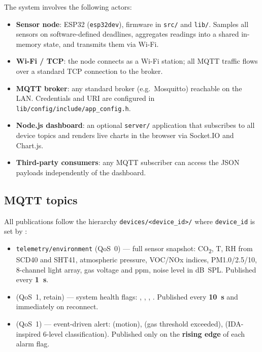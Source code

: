 \documentclass[11pt,a4paper]{article}
\begin{document}
The system involves the following actors:
\begin{itemize}[leftmargin=*]
    \item \textbf{Sensor node}: ESP32 (\texttt{esp32dev}), firmware in \texttt{src/} and \texttt{lib/}.
          Samples all sensors on software-defined deadlines, aggregates readings into a shared
          in-memory state, and transmits them via Wi-Fi.
    \item \textbf{Wi-Fi / TCP}: the node connects as a Wi-Fi station; all MQTT traffic flows over
          a standard TCP connection to the broker.
    \item \textbf{MQTT broker}: any standard broker (e.g.\ Mosquitto) reachable on the LAN.
          Credentials and URI are configured in \texttt{lib/config/include/app\_config.h}.
    \item \textbf{Node.js dashboard}: an optional \texttt{server/} application that subscribes to
          all device topics and renders live charts in the browser via Socket.IO and Chart.js.
    \item \textbf{Third-party consumers}: any MQTT subscriber can access the JSON payloads
          independently of the dashboard.
\end{itemize}

\vspace{5pt}
\subsection{MQTT topics}
\vspace{5pt}

All publications follow the hierarchy \texttt{devices/\textless device\_id\textgreater /}
where \texttt{device\_id} is set by \texttt{}:

\begin{itemize}[leftmargin=*]
    \item \texttt{telemetry/environment} (QoS~0) --- full sensor snapshot:
          CO\textsubscript{2}, T, RH from SCD40 and SHT41, atmospheric pressure, VOC/NOx indices,
          PM1.0/2.5/10, 8-channel light array, gas voltage and ppm, noise level in dB~SPL.
          Published every \textbf{1~s}.
    \item \texttt{} (QoS~1, retain) --- system health flags:
          \texttt{}, \texttt{}, \texttt{},
          \texttt{}. Published every \textbf{10~s} and immediately on reconnect.
    \item \texttt{} (QoS~1) --- event-driven alert:
          \texttt{} (motion), \texttt{} (gas threshold exceeded),
          \texttt{} (IDA-inspired 6-level classification).
          Published only on the \textbf{rising edge} of each alarm flag.
\end{itemize}
\end{document}
